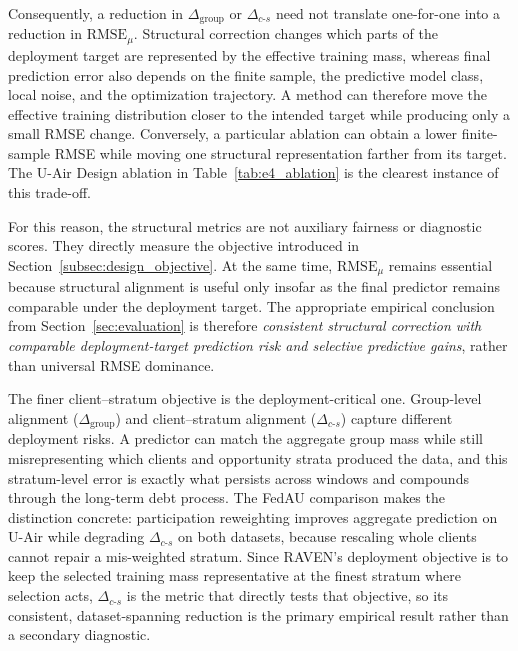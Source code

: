 \documentclass[letterpaper,journal]{IEEEtran}
\begin{document}
Consequently, a reduction in
$\Delta_{\mathrm{group}}$ or $\Delta_{c\text{-}s}$ need not translate
one-for-one into a reduction in $\mathrm{RMSE}_{\mu}$.  Structural correction
changes which parts of the deployment target are represented by the effective
training mass, whereas final prediction error also depends on the finite sample,
the predictive model class, local noise, and the optimization trajectory.  A
method can therefore move the effective training distribution closer to the
intended target while producing only a small RMSE change.  Conversely, a
particular ablation can obtain a lower finite-sample RMSE while moving one
structural representation farther from its target.  The U-Air Design ablation
in Table~\ref{tab:e4_ablation} is the clearest instance of this trade-off.

For this reason, the structural metrics are not auxiliary fairness or
diagnostic scores.  They directly measure the objective introduced in
Section~\ref{subsec:design_objective}.  At the same time,
$\mathrm{RMSE}_{\mu}$ remains essential because structural alignment is useful
only insofar as the final predictor remains comparable under the deployment
target.  The appropriate empirical conclusion from Section~\ref{sec:evaluation}
is therefore \emph{consistent structural correction with comparable
deployment-target prediction risk and selective predictive gains}, rather than
universal RMSE dominance.

The finer client--stratum objective is the deployment-critical one.  Group-level
alignment ($\Delta_{\mathrm{group}}$) and client--stratum alignment
($\Delta_{c\text{-}s}$) capture different deployment risks.  A predictor can
match the aggregate group mass while still misrepresenting which clients and
opportunity strata produced the data, and this stratum-level error is exactly
what persists across windows and compounds through the long-term debt process.
The FedAU comparison makes the distinction concrete: participation reweighting
improves aggregate prediction on U-Air while degrading $\Delta_{c\text{-}s}$ on
both datasets, because rescaling whole clients cannot repair a mis-weighted
stratum.  Since RAVEN's deployment objective is to keep the selected training
mass representative at the finest stratum where selection acts,
$\Delta_{c\text{-}s}$ is the metric that directly tests that objective, so its
consistent, dataset-spanning reduction is the primary empirical result rather
than a secondary diagnostic.
\end{document}
